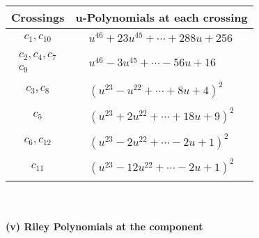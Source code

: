 \documentclass[1p]{elsarticle_modified}
\theoremstyle{definition}
\begin{document}
\begin{tabular}{m{50pt}|m{274pt}}
Crossings & \hspace{64pt}u-Polynomials at each crossing \\
\hline $$\begin{aligned}c_{1},c_{10}\end{aligned}$$&$\begin{aligned}
&u^{46}+23 u^{45}+\cdots+288 u+256
\end{aligned}$\\
\hline $$\begin{aligned}c_{2},c_{4},c_{7}\\c_{9}\end{aligned}$$&$\begin{aligned}
&u^{46}-3 u^{45}+\cdots-56 u+16
\end{aligned}$\\
\hline $$\begin{aligned}c_{3},c_{8}\end{aligned}$$&$\begin{aligned}
&(u^{23}- u^{22}+\cdots+8 u+4)^{2}
\end{aligned}$\\
\hline $$\begin{aligned}c_{5}\end{aligned}$$&$\begin{aligned}
&(u^{23}+2 u^{22}+\cdots+18 u+9)^{2}
\end{aligned}$\\
\hline $$\begin{aligned}c_{6},c_{12}\end{aligned}$$&$\begin{aligned}
&(u^{23}-2 u^{22}+\cdots-2 u+1)^{2}
\end{aligned}$\\
\hline $$\begin{aligned}c_{11}\end{aligned}$$&$\begin{aligned}
&(u^{23}-12 u^{22}+\cdots-2 u+1)^{2}
\end{aligned}$\\
\hline
\end{tabular}\\~\\
\newpage\renewcommand{\arraystretch}{1}
\flushleft \textbf{(v) Riley Polynomials at the component}\newline \\
\end{document}
